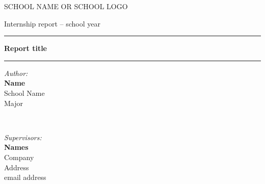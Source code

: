 \begin{titlepage}
\begin{center}
SCHOOL NAME OR SCHOOL LOGO
\end{center}

\begin{center}
	\large Internship report \--- school year
\end{center}

\vspace{6cm}

\noindent \rule{\linewidth}{0.1mm}


\begin{center}
\huge \textbf{Report title}
\end{center}

\noindent \rule{\linewidth}{0.1mm}

\vfill




\begin{minipage}{0.45\textwidth}
\begin{flushleft}
\emph{Author:} \\
\textbf{{\large Name}} \\
School Name \\
Major \\
$ $ \\
\end{flushleft}
\end{minipage} \hfill
~
\begin{minipage}{0.45\textwidth}
\begin{flushright}
\emph{Supervisors:}\\
\textbf{{\large Names}} \\
Company \\
Address\\
email address \\
\end{flushright}
\end{minipage}


\end{titlepage}

